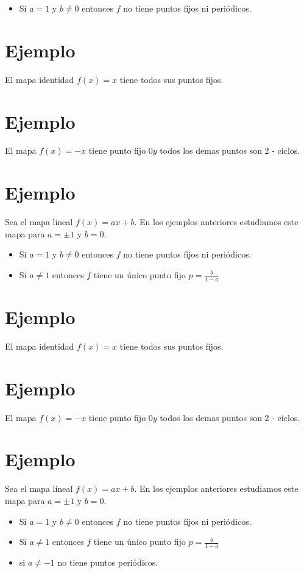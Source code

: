 \documentclass[11pt]{beamer}
\begin{document}
\begin{itemize}
  \item Si $a=1$ y $b \neq 0$ entonces $f$ no tiene puntos fijos ni periódicos.
\end{itemize}

\section*{Ejemplo}
El mapa identidad $f(x)=x$ tiene todos sus puntos fijos.

\section*{Ejemplo}
El mapa $f(x)=-x$ tiene punto fijo $0 y$ todos los demas puntos son 2 - ciclos.

\section*{Ejemplo}
Sea el mapa lineal $f(x)=a x+b$. En los ejemplos anteriores estudiamos este mapa para $a= \pm 1$ y $b=0$.

\begin{itemize}
  \item Si $a=1$ y $b \neq 0$ entonces $f$ no tiene puntos fijos ni periódicos.
  \item Si $a \neq 1$ entonces $f$ tiene un único punto fijo $p=\frac{b}{1-a}$
\end{itemize}

\section*{Ejemplo}
El mapa identidad $f(x)=x$ tiene todos sus puntos fijos.

\section*{Ejemplo}
El mapa $f(x)=-x$ tiene punto fijo $0 y$ todos los demas puntos son 2 - ciclos.

\section*{Ejemplo}
Sea el mapa lineal $f(x)=a x+b$. En los ejemplos anteriores estudiamos este mapa para $a= \pm 1$ y $b=0$.

\begin{itemize}
  \item Si $a=1$ y $b \neq 0$ entonces $f$ no tiene puntos fijos ni periódicos.
  \item Si $a \neq 1$ entonces $f$ tiene un único punto fijo $p=\frac{b}{1-a}$
  \item si $a \neq-1$ no tiene puntos periódicos.
\end{itemize}
\end{document}
